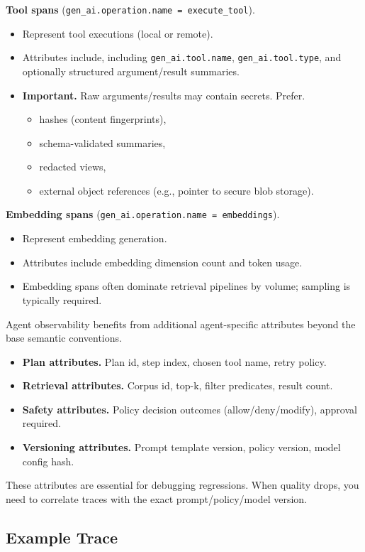 \textbf{Tool spans} (\texttt{gen\_ai.operation.name = execute\_tool}).
\begin{itemize}
\item Represent tool executions (local or remote).
\item Attributes include, including \texttt{gen\_ai.tool.name},
  \texttt{gen\_ai.tool.type},
  and optionally structured argument/result summaries.
\item \textbf{Important.} Raw arguments/results may contain secrets. Prefer.
  \begin{itemize}
  \item hashes (content fingerprints),
  \item schema-validated summaries,
  \item redacted views,
  \item external object references (e.g., pointer to secure blob storage).
  \end{itemize}
\end{itemize}

\textbf{Embedding spans} (\texttt{gen\_ai.operation.name = embeddings}).
\begin{itemize}
\item Represent embedding generation.
\item Attributes include embedding dimension count and token usage.
\item Embedding spans often dominate retrieval pipelines by volume; sampling is typically required.
\end{itemize}

Agent observability benefits from additional agent-specific attributes beyond the base semantic conventions.
\begin{itemize}
\item \textbf{Plan attributes.} Plan id, step index, chosen tool name, retry policy.
\item \textbf{Retrieval attributes.} Corpus id, top-k, filter predicates, result count.
\item \textbf{Safety attributes.} Policy decision outcomes (allow/deny/modify), approval required.
\item \textbf{Versioning attributes.} Prompt template version, policy version, model config hash.
\end{itemize}

These attributes are essential for debugging regressions. When quality drops, you need to correlate traces with the exact prompt/policy/model version.

\subsection{Example Trace}

